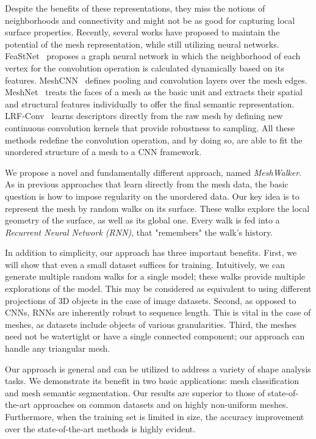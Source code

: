 \documentclass[acmtog]{acmart}
\begin{document}
Despite the benefits of these representations, they miss the notions of neighborhoods and connectivity and might not be as good for capturing local surface properties.
Recently, several works have proposed to maintain the potential of the mesh representation, while still utilizing neural networks.
FeaStNet~\cite{verma2018feastnet} proposes a graph neural network in which the neighborhood of each vertex for the convolution operation is calculated dynamically based on its features.
MeshCNN~\cite{hanocka2019meshcnn} defines pooling and convolution layers over the mesh edges.
MeshNet~\cite{feng2019meshnet} treats the faces of a mesh as the basic unit and extracts their spatial and structural features individually to offer the ﬁnal semantic representation.
LRF-Conv~\cite{yang2020continuous} learns descriptors directly from the raw mesh by defining new continuous convolution kernels that provide robustness to sampling.
All these methods redefine the convolution operation, and by doing so, are able to fit the unordered structure of a mesh to a CNN framework.

We propose a novel and fundamentally different approach,  named {\em MeshWalker}.
As in previous approaches that learn directly from the mesh data, the basic question is how to impose regularity on the unordered data.
Our key idea is to represent the mesh by random walks on its surface.
These walks explore the local geometry of the surface, as well as its global one.
Every walk is fed into a {\em Recurrent Neural Network (RNN)}, that "remembers" the walk's history.

In addition to simplicity, our approach has three important benefits. 
First, we will show that even a small dataset suffices for training.
Intuitively, we can generate multiple random walks for a single model; these walks provide multiple explorations of the model. 
This may be considered as equivalent to using different projections of 3D objects in the case of image datasets.
Second, as opposed to CNNs, RNNs are inherently robust to sequence length.
This is vital in the case of meshes, as datasets include objects of various granularities.
Third, the meshes need not be watertight or have a single connected component; our approach can handle any triangular mesh.

Our approach is general and can be utilized to address a variety of shape analysis tasks.
We demonstrate its benefit in two basic applications: mesh classification and mesh semantic segmentation.
Our results are superior to those of state-of-the-art approaches on common datasets and on highly non-uniform meshes.
Furthermore, when the training set is limited in size, the accuracy improvement over the state-of-the-art methods is highly evident.
\end{document}

